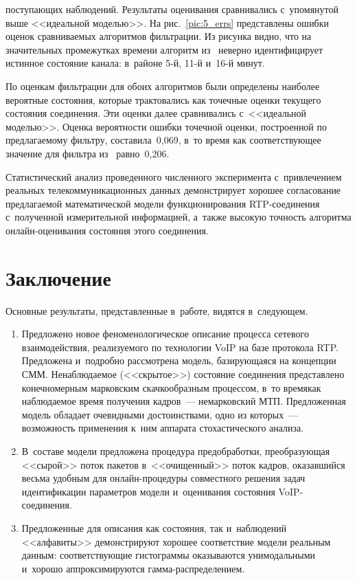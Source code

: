 \begin{multicols}{2}

\noindent
 поступающих наблюдений.
   Результаты  оценивания
сравнивались с~упомянутой выше <<идеальной моделью>>. На
рис.~\ref{pic:5_errs} пред\-став\-ле\-ны ошибки оценок сравниваемых
алгоритмов фильтрации. Из рисунка видно, что на значительных
промежутках времени алгоритм из~\cite{EAM_94} неверно идентифицирует
истинное состояние канала: в~районе 5-й, 11-й и~16-й минут.


По оценкам фильтрации для обоих алгоритмов были определены наиболее
вероятные состояния, которые трактовались как точечные оценки
текущего состояния соединения. Эти оценки
 далее сравнивались с~<<идеальной моделью>>. Оценка вероятности ошибки 
 точечной оценки, построенной по предлагаемому фильтру, составила~0,069, 
 в~то время как соответствующее значение для фильтра  из~\cite{EAM_94} равно~0,206.


Статистический анализ проведенного численного эксперимента 
с~привлечением реальных телекоммуникационных данных демонстрирует
хорошее согласование предлагаемой математической модели
функционирования RTP-со\-еди\-не\-ния с~полученной измерительной
информацией, а~также высокую точность алгоритма он\-лайн-оце\-ни\-ва\-ния
состояния этого соединения.


\section{Заключение} %


Основные результаты, представленные в~работе, видятся в~следующем.
\begin{enumerate}[1.]
\item
Предложено новое феноменологическое описание процесса
сетевого взаимодействия, реализуемого по технологии VoIP на базе
протокола RTP. Предложена и~подробно рассмотрена модель,
базирующаяся на концепции СММ. Ненаблюдаемое (<<скрытое>>) состояние
соединения представлено конечномерным марковским скачкообразным
процессом, в~то время\linebreak как наблюдаемое время получения кадров~---
немарковский МТП. Предложенная модель \mbox{об\-ладает} очевидными
достоинствами, одно из
 которых~--- возможность применения к~ним
\mbox{аппарата} стохастического анализа. 
\item В~составе модели
предложена процедура пред\-об\-работки, преобразующая <<сырой>> поток
пакетов в~<<очищенный>> поток кадров, оказавшийся весьма удобным для
он\-лайн-про\-це\-ду\-ры совместного решения задач идентификации параметров
модели и~оценивания состояния VoIP-со\-еди\-не\-ния. 
\item Предложенные для описания как состояния, так и~наблюдений
<<алфавиты>> демонстрируют хорошее соответствие модели реальным
данным: соответствующие гистограммы оказываются унимодальными 
и~хорошо аппроксимируются гам\-ма-рас\-пре\-де\-ле\-нием.
\end{enumerate}


\end{multicols}
